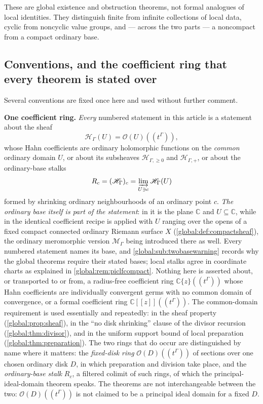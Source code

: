 \documentclass[11pt,letterpaper]{article}
\theoremstyle{definition}
\theoremstyle{remark}
\newcommand{\C}{\mathbb C}
\newcommand{\OO}{\mathcal O}
\newcommand{\HH}{\mathscr H_\Gamma}
\newcommand{\HP}{\mathscr H_{\Gamma,+}}
\newcommand{\HI}{\mathscr H_{\Gamma,\ge0}}
\newcommand{\MG}{\mathscr M_\Gamma}
\numberwithin{equation}{section}
\begin{document}
These are global existence and obstruction theorems, not formal analogues of local identities. They distinguish finite from infinite collections of local data, cyclic from noncyclic value groups, and --- across the two parts --- a noncompact from a compact ordinary base.

\subsection{Conventions, and the coefficient ring that every theorem is stated over}\label{global:sub:conventions}

Several conventions are fixed once here and used without further comment.

\smallskip
\noindent\textbf{One coefficient ring.} \emph{Every} numbered statement in this article is a statement about the sheaf
\[
  \HH(U)=\OO(U)((t^\Gamma)),
\]
whose Hahn coefficients are ordinary holomorphic functions on the \emph{common} ordinary domain $U$, or about its subsheaves $\HI$ and $\HP$, or about the ordinary-base stalks
\[
  R_c=(\HH)_c=\varinjlim_{U\ni c}\HH(U)
\]
formed by shrinking ordinary neighbourhoods of an ordinary point $c$. \emph{The ordinary base itself is part of the statement}: in  it is the plane $\C$ and $U\subseteq\C$, while in  the identical coefficient recipe is applied with $U$ ranging over the opens of a fixed compact connected ordinary Riemann surface $X$ (\cref{global:def:compactsheaf}), the ordinary meromorphic version $\MG$ being introduced there as well. Every numbered statement names its base, and \cref{global:sub:twobasewarning} records why the global theorems require their stated bases; local stalks agree in coordinate charts as explained in \cref{global:rem:piclfcompact}. Nothing here is asserted about, or transported to or from, a radius-free coefficient ring $\C\{z\}((t^\Gamma))$ whose Hahn coefficients are individually convergent germs with no common domain of convergence, or a formal coefficient ring $\C[[z]]((t^\Gamma))$. The common-domain requirement is used essentially and repeatedly: in the sheaf property (\cref{global:prop:sheaf}), in the ``no disk shrinking'' clause of the divisor recursion (\cref{global:thm:divisor}), and in the uniform support bound of local preparation (\cref{global:thm:preparation}). The two rings that do occur are distinguished by name where it matters: the \emph{fixed-disk ring} $\OO(D)((t^\Gamma))$ of sections over one chosen ordinary disk $D$, in which preparation and division take place, and the \emph{ordinary-base stalk} $R_c$, a filtered colimit of such rings, of which the principal-ideal-domain theorem speaks. The theorems are not interchangeable between the two: $\OO(D)((t^\Gamma))$ is not claimed to be a principal ideal domain for a fixed $D$.
\end{document}
